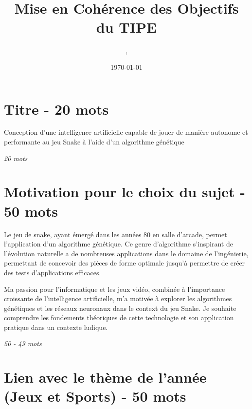 \documentclass[11pt,a4paper]{article}
\author{\monNom, \maClasse}
\title{Mise en Cohérence des Objectifs du TIPE}
\date{\today}
\makeatletter
\renewcommand{\maketitle}{
  \thispagestyle{empty}
  \begin{center}
  \shadowbox{\parbox{5in}{%
     \centering%
     \textrm{\textbf{\Large \@title}}\\
     \vspace{0.2cm}
     \textrm{\large \@author}\\
     \vspace{0.2cm}
     \textrm{\large \@date}
  }} 
  \end{center}
  \null
}
\makeatother
\begin{document}
\maketitle

\tableofcontents

\thispagestyle{fancy}

\section{Titre - 20 mots}

\begin{center}
    Conception d'une intelligence artificielle capable de jouer de manière autonome et performante au jeu Snake à l'aide d'un algorithme génétique  
\end{center}

\textit{20 mots}

\section{Motivation pour le choix du sujet - 50 mots}


Le jeu de snake, ayant émergé dans les années 80 en salle d'arcade,
permet l'application d'un algorithme génétique.
Ce genre d'algorithme s'inspirant de l'évolution naturelle a de 
nombreuses applications dans le domaine de l'ingénierie, permettant de concevoir 
des pièces de forme optimale jusqu'à permettre de créer des tests d'applications
efficaces.


Ma passion pour l'informatique et les jeux vidéo, combinée à l'importance 
croissante de l'intelligence artificielle, m'a motivée à explorer les algorithmes 
génétiques et les réseaux neuronaux dans le context du jeu Snake.
Je souhaite comprendre les fondements théoriques de cette technologie et son 
application pratique dans un contexte ludique.


\textit{50 - 49 mots}

\section{Lien avec le thème de l'année (Jeux et Sports) - 50 mots}
\end{document}
